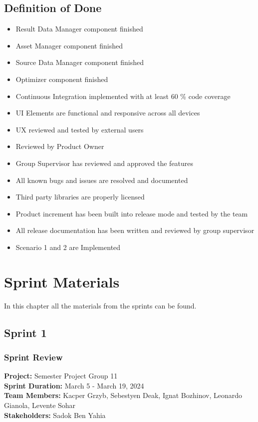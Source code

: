 \documentclass[12pt]{report}
\begin{document}
\section*{Definition of Done}

\begin{itemize}
  \item Result Data Manager component finished
  \item Asset Manager component finished
  \item Source Data Manager component finished
  \item Optimizer component finished
  \item Continuous Integration implemented with at least 60 \% code coverage
  \item UI Elements are functional and responsive across all devices
  \item UX reviewed and tested by external users
  \item Reviewed by Product Owner
  \item Group Supervisor has reviewed and approved the features
  \item All known bugs and issues are resolved and documented
  \item Third party libraries are properly licensed
  \item Product increment has been built into release mode and tested by the team
  \item All release documentation has been written and reviewed by group supervisor
  \item Scenario 1 and 2 are Implemented
\end{itemize}


\chapter{Sprint Materials}
\label{sec:sprints}
In this chapter all the materials from the sprints can be found.




\section{Sprint 1}
\subsection*{Sprint Review}
\textbf{Project:} Semester Project Group 11 \\
\textbf{Sprint Duration:} March 5 - March 19, 2024 \\
\textbf{Team Members:} Kacper Grzyb, Sebestyen Deak, Ignat Bozhinov, Leonardo Gianola, Levente Sohar \\
\textbf{Stakeholders:} Sadok Ben Yahia
\end{document}
